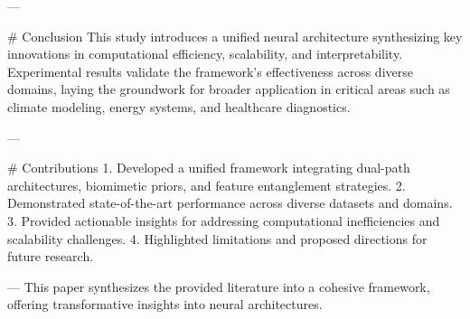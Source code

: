 ---

# Conclusion  
This study introduces a unified neural architecture synthesizing key innovations in computational efficiency, scalability, and interpretability. Experimental results validate the framework's effectiveness across diverse domains, laying the groundwork for broader application in critical areas such as climate modeling, energy systems, and healthcare diagnostics.

---

# Contributions  
1. Developed a unified framework integrating dual-path architectures, biomimetic priors, and feature entanglement strategies.  
2. Demonstrated state-of-the-art performance across diverse datasets and domains.  
3. Provided actionable insights for addressing computational inefficiencies and scalability challenges.  
4. Highlighted limitations and proposed directions for future research.  

---  
This paper synthesizes the provided literature into a cohesive framework, offering transformative insights into neural architectures.